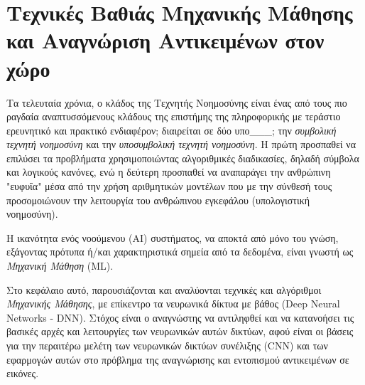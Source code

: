 \chapter{Τεχνικές Βαθιάς Μηχανικής Μάθησης και Αναγνώριση Αντικειμένων στον χώρο}
\label{chapter:theory}

Τα τελευταία χρόνια, ο κλάδος της Τεχνητής Νοημοσύνης είναι ένας από τους πιο ραγδαία
αναπτυσσόμενους κλάδους της επιστήμης της πληροφορικής με τεράστιο
ερευνητικό και πρακτικό ενδιαφέρον; διαιρείται σε δύο υπο\_\_\_; την \emph{συμβολική τεχνητή
νοημοσύνη} και την \emph{υποσυμβολική τεχνητή νοημοσύνη}. Η πρώτη προσπαθεί να
επιλύσει τα προβλήματα χρησιμοποιώντας αλγοριθμικές διαδικασίες, δηλαδή
σύμβολα και λογικούς κανόνες, ενώ η δεύτερη προσπαθεί να αναπαράγει την
ανθρώπινη "ευφυΐα" μέσα από την χρήση αριθμητικών μοντέλων
που με την σύνθεσή τους προσομοιώνουν την λειτουργία του ανθρώπινου εγκεφάλου
(υπολογιστική νοημοσύνη).

Η ικανότητα ενός νοούμενου (AI) συστήματος, να αποκτά από μόνο του γνώση,
εξάγοντας πρότυπα ή/και χαρακτηριστικά σημεία από τα δεδομένα,
είναι γνωστή ως \emph{Μηχανική Μάθηση} (ML).

Στο κεφάλαιο αυτό, παρουσιάζονται και αναλύονται τεχνικές και αλγόριθμοι
\emph{Μηχανικής Μάθησης}, με επίκεντρο τα νευρωνικά δίκτυα με βάθος (Deep Neural Networks - DNN).
Στόχος είναι ο αναγνώστης να αντιληφθεί και να κατανοήσει τις βασικές αρχές και
λειτουργίες των νευρωνικών αυτών δικτύων, αφού είναι οι βάσεις για την περαιτέρω
μελέτη των νευρωνικών δικτύων συνέλιξης (CNN) και των εφαρμογών αυτών στο
πρόβλημα της αναγνώρισης και εντοπισμού αντικειμένων σε εικόνες.




